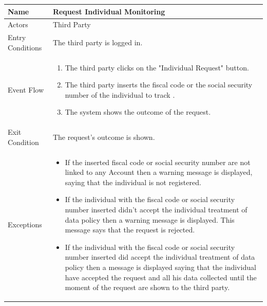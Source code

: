 \begin{enumerate}
\FloatBarrier
\begin{table}[h]
\begin{tabular}{|l|l|}
\hline
Name             & Request Individual Monitoring \\ \hline
Actors           & Third Party  \\ \hline
Entry Conditions & The third party is logged in.    \\ \hline
Event Flow       & \parbox{.45\textwidth}{\begin{enumerate}
            \item The third party clicks on the "Individual Request" button.
            \item The third party inserts the fiscal code or the social security number of the individual to track .
            \item The system shows the outcome of the request. 
        \end{enumerate}}\\ \hline
Exit Condition   & The request's outcome is shown.\\ \hline
Exceptions       & \parbox{.45\textwidth}  
{\begin{itemize}
\item If the inserted fiscal code or social security number are not linked to any Account then a warning message is displayed, saying that the individual is not registered.
\item If the individual with the fiscal code or social security number inserted didn't accept the individual treatment of data policy then a warning message is displayed. This message says that the request is rejected.
\item If the individual with the fiscal code or social security number inserted did accept the individual treatment of data policy then a message is displayed saying that the individual have accepted the request and all his data collected until the moment of the request are shown to the third party.
\end{itemize}}\\ \hline
\end{tabular}
\end{table}
\FloatBarrier


\end{enumerate}
